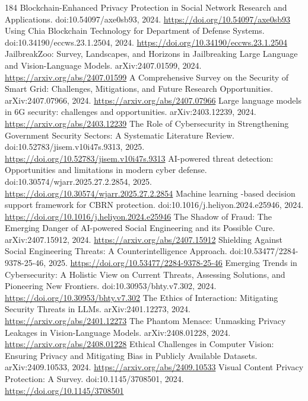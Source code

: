\documentclass[11pt]{article}
\begin{document}
\begin{thebibliography}{184}
 Blockchain-Enhanced Privacy Protection in Social Network Research and Applications. doi:10.54097/axe0sb93, 2024. \url{https://doi.org/10.54097/axe0sb93}
 Using Chia Blockchain Technology for Department of Defense Systems. doi:10.34190/eccws.23.1.2504, 2024. \url{https://doi.org/10.34190/eccws.23.1.2504}
 JailbreakZoo: Survey, Landscapes, and Horizons in Jailbreaking Large Language and Vision-Language Models. arXiv:2407.01599, 2024. \url{https://arxiv.org/abs/2407.01599}
 A Comprehensive Survey on the Security of Smart Grid: Challenges, Mitigations, and Future Research Opportunities. arXiv:2407.07966, 2024. \url{https://arxiv.org/abs/2407.07966}
 Large language models in 6G security: challenges and opportunities. arXiv:2403.12239, 2024. \url{https://arxiv.org/abs/2403.12239}
 The Role of Cybersecurity in Strengthening Government Security Sectors: A Systematic Literature Review. doi:10.52783/jisem.v10i47s.9313, 2025. \url{https://doi.org/10.52783/jisem.v10i47s.9313}
 AI-powered threat detection: Opportunities and limitations in modern cyber defense. doi:10.30574/wjarr.2025.27.2.2854, 2025. \url{https://doi.org/10.30574/wjarr.2025.27.2.2854}
 Machine learning -based decision support framework for CBRN protection. doi:10.1016/j.heliyon.2024.e25946, 2024. \url{https://doi.org/10.1016/j.heliyon.2024.e25946}
 The Shadow of Fraud: The Emerging Danger of AI-powered Social Engineering and its Possible Cure. arXiv:2407.15912, 2024. \url{https://arxiv.org/abs/2407.15912}
 Shielding Against Social Engineering Threats: A Counterintelligence Approach. doi:10.53477/2284-9378-25-46, 2025. \url{https://doi.org/10.53477/2284-9378-25-46}
 Emerging Trends in Cybersecurity: A Holistic View on Current Threats, Assessing Solutions, and Pioneering New Frontiers. doi:10.30953/bhty.v7.302, 2024. \url{https://doi.org/10.30953/bhty.v7.302}
 The Ethics of Interaction: Mitigating Security Threats in LLMs. arXiv:2401.12273, 2024. \url{https://arxiv.org/abs/2401.12273}
 The Phantom Menace: Unmasking Privacy Leakages in Vision-Language Models. arXiv:2408.01228, 2024. \url{https://arxiv.org/abs/2408.01228}
 Ethical Challenges in Computer Vision: Ensuring Privacy and Mitigating Bias in Publicly Available Datasets. arXiv:2409.10533, 2024. \url{https://arxiv.org/abs/2409.10533}
 Visual Content Privacy Protection: A Survey. doi:10.1145/3708501, 2024. \url{https://doi.org/10.1145/3708501}

\end{thebibliography}
\end{document}
